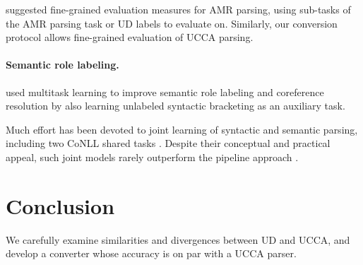 \documentclass[11pt,a4paper]{article}
\begin{document}
 suggested fine-grained evaluation measures
for AMR parsing, using sub-tasks of the AMR parsing task or UD labels to evaluate on.
Similarly, our conversion protocol allows fine-grained evaluation of UCCA parsing.

\paragraph{Semantic role labeling.}

 used multitask learning to improve semantic role labeling and coreference resolution
by also learning unlabeled syntactic bracketing as an auxiliary task.

Much effort has been devoted to joint learning of syntactic
and semantic parsing, including
two CoNLL shared tasks \cite{surdeanu2008conll,hajivc2009conll}.
Despite their conceptual and practical appeal, such joint models rarely outperform
the pipeline approach %
\cite{lluis2008joint,henderson2013multilingual,D15-1169,swayamdipta-EtAl:2016:CoNLL,swayamdipta2017frame}.

%


\section{Conclusion}\label{sec:conclusion}

We carefully examine similarities and divergences between UD and UCCA,
and develop a converter whose accuracy is on par with a UCCA parser.




\end{document}
